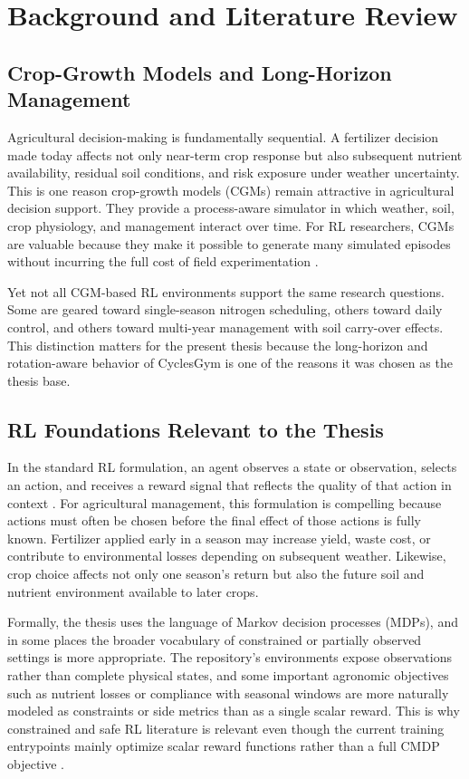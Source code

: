 \chapter{Background and Literature Review}

\section{Crop-Growth Models and Long-Horizon Management}

Agricultural decision-making is fundamentally sequential. A fertilizer decision made today affects not only near-term crop response but also subsequent nutrient availability, residual soil conditions, and risk exposure under weather uncertainty. This is one reason crop-growth models (CGMs) remain attractive in agricultural decision support. They provide a process-aware simulator in which weather, soil, crop physiology, and management interact over time. For RL researchers, CGMs are valuable because they make it possible to generate many simulated episodes without incurring the full cost of field experimentation \citep{gautron2022review,turchetta2022cyclesgym}.

Yet not all CGM-based RL environments support the same research questions. Some are geared toward single-season nitrogen scheduling, others toward daily control, and others toward multi-year management with soil carry-over effects. This distinction matters for the present thesis because the long-horizon and rotation-aware behavior of CyclesGym is one of the reasons it was chosen as the thesis base.

\section{RL Foundations Relevant to the Thesis}

In the standard RL formulation, an agent observes a state or observation, selects an action, and receives a reward signal that reflects the quality of that action in context \citep{sutton2018rl}. For agricultural management, this formulation is compelling because actions must often be chosen before the final effect of those actions is fully known. Fertilizer applied early in a season may increase yield, waste cost, or contribute to environmental losses depending on subsequent weather. Likewise, crop choice affects not only one season's return but also the future soil and nutrient environment available to later crops.

Formally, the thesis uses the language of Markov decision processes (MDPs), and in some places the broader vocabulary of constrained or partially observed settings is more appropriate. The repository's environments expose observations rather than complete physical states, and some important agronomic objectives such as nutrient losses or compliance with seasonal windows are more naturally modeled as constraints or side metrics than as a single scalar reward. This is why constrained and safe RL literature is relevant even though the current training entrypoints mainly optimize scalar reward functions rather than a full CMDP objective \citep{huang2022cmorl,zhao2023safesurvey}.

